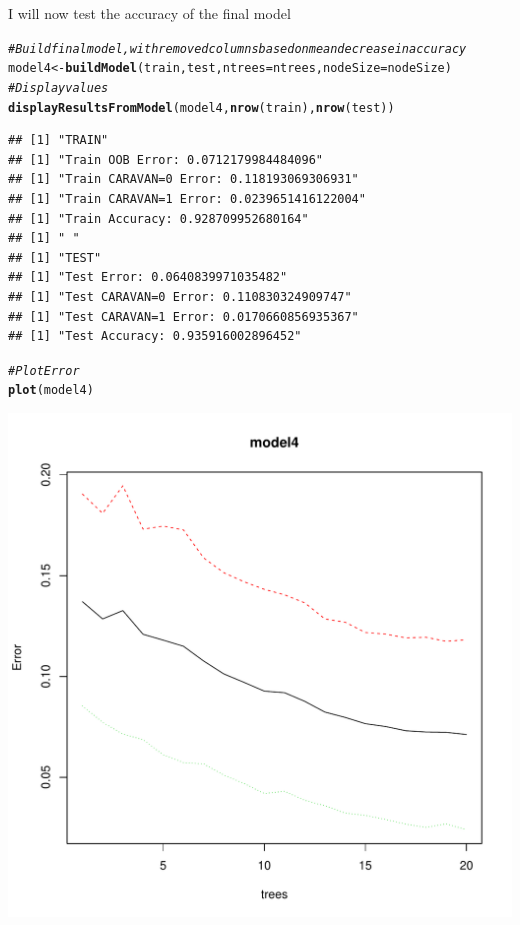 \documentclass{article}\usepackage[]{graphicx}\usepackage[]{color}
\makeatletter
\def\maxwidth{ %
  \ifdim\Gin@nat@width>\linewidth
    \linewidth
  \else
    \Gin@nat@width
  \fi
}
\newcommand{\hlcom}[1]{\textcolor[rgb]{0.678,0.584,0.686}{\textit{#1}}}%
\newcommand{\hlstd}[1]{\textcolor[rgb]{0.345,0.345,0.345}{#1}}%
\newcommand{\hlkwb}[1]{\textcolor[rgb]{0.69,0.353,0.396}{#1}}%
\newcommand{\hlkwc}[1]{\textcolor[rgb]{0.333,0.667,0.333}{#1}}%
\newcommand{\hlkwd}[1]{\textcolor[rgb]{0.737,0.353,0.396}{\textbf{#1}}}%
\newenvironment{kframe}{%
 \def\at@end@of@kframe{}%
 \ifinner\ifhmode%
  \def\at@end@of@kframe{\end{minipage}}%
  \begin{minipage}{\columnwidth}%
 \fi\fi%
 \def\FrameCommand##1{\hskip\@totalleftmargin \hskip-\fboxsep
 \colorbox{shadecolor}{##1}\hskip-\fboxsep
     \hskip-\linewidth \hskip-\@totalleftmargin \hskip\columnwidth}%
 \MakeFramed {\advance\hsize-\width
   \@totalleftmargin\z@ \linewidth\hsize
   \@setminipage}}%
 {\par\unskip\endMakeFramed%
 \at@end@of@kframe}
\newenvironment{knitrout}{}{} %
\makeatother
\begin{document}
I will now test the accuracy of the final model
\begin{knitrout}
\color{fgcolor}\begin{kframe}
\begin{alltt}
\hlcom{#Build final model, with removed columns based on mean decrease in accuracy}
\hlstd{model4}\hlkwb{<-}\hlkwd{buildModel}\hlstd{(train,test,}\hlkwc{ntrees}\hlstd{=ntrees,}\hlkwc{nodeSize}\hlstd{=nodeSize)}
\hlcom{#Display values}
\hlkwd{displayResultsFromModel}\hlstd{(model4,}\hlkwd{nrow}\hlstd{(train),}\hlkwd{nrow}\hlstd{(test))}
\end{alltt}
\begin{verbatim}
## [1] "TRAIN"
## [1] "Train OOB Error: 0.0712179984484096"
## [1] "Train CARAVAN=0 Error: 0.118193069306931"
## [1] "Train CARAVAN=1 Error: 0.0239651416122004"
## [1] "Train Accuracy: 0.928709952680164"
## [1] " "
## [1] "TEST"
## [1] "Test Error: 0.0640839971035482"
## [1] "Test CARAVAN=0 Error: 0.110830324909747"
## [1] "Test CARAVAN=1 Error: 0.0170660856935367"
## [1] "Test Accuracy: 0.935916002896452"
\end{verbatim}
\begin{alltt}
\hlcom{#Plot Error}
\hlkwd{plot}\hlstd{(model4)}
\end{alltt}
\end{kframe}
\includegraphics[width=\maxwidth]{figure/unnamed-chunk-42-1} 

\end{knitrout}
\end{document}

